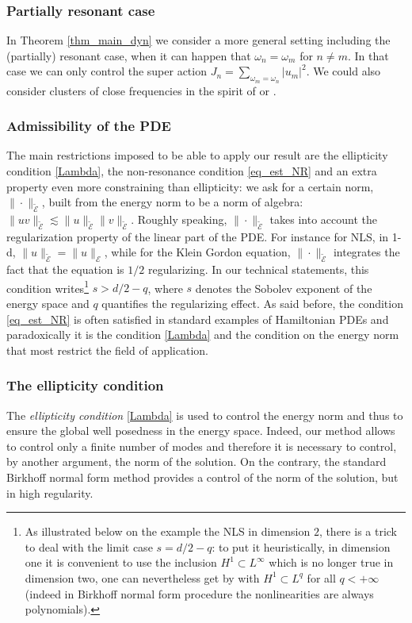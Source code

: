 \subsubsection*{Partially resonant case}
In Theorem \ref{thm_main_dyn} we consider a more general setting including the (partially) resonant case, \ie when it can happen that $\omega_n=\omega_m$ for $n\neq m$. In that case we can only control the super action $J_n=\sum_{\omega_m=\omega_n}|u_m|^2$. We could also consider clusters of close frequencies in the spirit of \cite{BDGS07} or \cite{GIP}.

\subsubsection*{Admissibility of the PDE}
The main restrictions imposed to be able to apply our result are the ellipticity condition \eqref{Lambda}, the non-resonance condition \eqref{eq_est_NR} and an extra property even more constraining than ellipticity: we ask for a certain norm, $\|\cdot\|_{\tilde{\mathcal{E}}}$, built from the energy norm to be a norm of algebra:
$\|uv\|_{\tilde{\mathcal{E}}}\lesssim \|u\|_{\tilde{\mathcal{E}}} \|v\|_{\tilde{\mathcal{E}}}$. Roughly speaking, $\|\cdot\|_{\tilde{\mathcal{E}}}$ takes into account the regularization property of the linear part of the PDE. For instance for NLS, in 1-d, $\| u\|_{\tilde{\mathcal{E}}}=\|u\|_{{\mathcal{E}}}$, while for the Klein Gordon equation, $\|\cdot\|_{\tilde{\mathcal{E}}}$ integrates the fact that the equation is $1/2$ regularizing. In our technical statements, this condition writes\footnote{As illustrated below on the example the NLS in dimension $2$, there is a trick to deal with the limit case $s=d/2-q$: to put it heuristically, in dimension one it is convenient to use the inclusion $H^1\subset L^\infty$ which is no longer true in dimension two, one can nevertheless get by with $H^1\subset L^q$ for all $q<+\infty$ (indeed in Birkhoff normal form procedure the nonlinearities are always polynomials).} $s>d/2-q$, where $s$ denotes the Sobolev exponent of the energy space and $q$ quantifies the regularizing effect. As said before, the condition \eqref{eq_est_NR} is often satisfied in standard examples of Hamiltonian PDEs and paradoxically it is the condition \eqref{Lambda} and the condition on the energy norm that most restrict the field of application.

\subsubsection*{The ellipticity condition}
The {\it ellipticity condition} \eqref{Lambda} is used to control the energy norm and thus to ensure the global well posedness in the energy space. Indeed, our method allows to control only a finite number of modes and therefore it is necessary to control, by another argument, the norm of the solution. On the contrary, the standard Birkhoff normal form method provides a control of the norm of the solution, but in high regularity.

